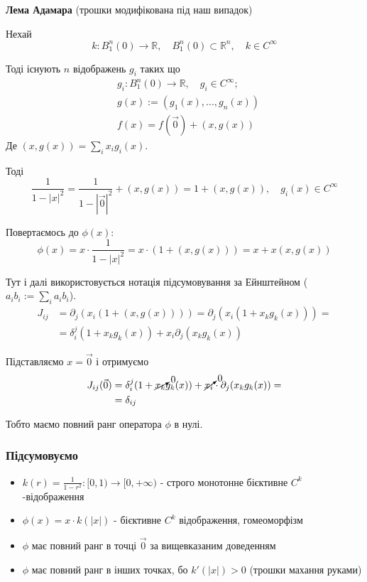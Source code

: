\documentclass[10pt, a4paper]{article} %
\newcommand{\R}{\mathbb{R}}
\begin{document}
\begin{mdframed}[backgroundcolor=purple!20]
    \textbf{Лема Адамара} (трошки модифікована під наш випадок)

    Нехай 
    \[k : B^n_1(0) \to \R, \quad B^n_1(0) \subset \R^n, \quad k \in C^\infty\]
    
    Тоді існують $n$ відображень $g_i$ таких що 
    \begin{align*}
        & g_i : B^n_1(0) \to \R, \quad g_i \in C^\infty;\\
        & g(x) := (g_1(x), ..., g_n(x))\\
        & f(x) = f(\vec 0) + (x, g(x)) 
    \end{align*}
    Де $(x,g(x)) = \sum_i x_ig_i(x)$.
\end{mdframed}

Тоді 
\[\frac{1}{1-|x|^2} = \frac{1}{1-|\vec 0|^2} + (x, g(x)) = 1 + (x, g(x)), \quad g_i(x)\in C^\infty\]

Повертаємось до $\phi(x)$:
\[\phi(x) = x \cdot \frac{1}{1-|x|^2} = x \cdot (1 + (x, g(x))) = x + x(x,g(x))\]

Тут і далі використовується нотація підсумовування за Ейнштейном ($a_ib_i := \sum_i a_ib_i$).
\begin{align*}
    J_{ij} &= \partial_j (x_i(1+(x,g(x)))) = \partial_j (x_i(1+x_kg_k(x))) = \\
    & = \delta^j_i (1+x_kg_k(x)) + x_i \partial_j (x_kg_k(x))
\end{align*}

Підставляємо $x=\vec 0$ і отримуємо
\begin{align*}
    J_{ij}(\vec 0) &= \delta^j_i (1+\cancelto{0}{x_k}g_k(x)) + \cancelto{0}{x_i} \cdot \partial_j (x_kg_k(x)) = \\
    & = \delta_{ij}
\end{align*}

Тобто маємо повний ранг оператора $\phi$ в нулі.

\subsubsection*{Підсумовуємо}

\begin{itemize}
    \item $k(r) = \frac{1}{1-r^2} : [0,1) \to [0,+\infty)$ - строго монотонне бієктивне $C^k$-відображення
    \item $\phi(x) = x \cdot k(|x|)$ - бієктивне $C^k$ відображення, гомеоморфізм
    \item $\phi$ має повний ранг в точці $\vec 0$ за вищевказаним доведенням
    \item $\phi$ має повний ранг в інших точках, бо $k'(|x|) > 0$ (трошки махання руками)
\end{itemize}
\end{document}
